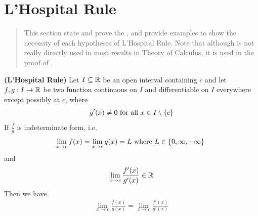 \documentclass{report}
\begin{document}
\section{L'Hospital Rule}
\begin{abstract}
  This section state and prove the , and provide examples to show the necessity of each hypotheses of L'Hospital Rule. Note that although  is not really directly used in most results in Theory of Calculus, it is used in the proof of . 
\end{abstract}
\begin{theorem}
\label{L'Hospital Rule}
\textbf{(L'Hospital Rule)} Let $I \subseteq \mathbb{R}$ be an open interval containing $c$ and let $f,g:I\rightarrow \mathbb{R}$ be two function continuous on $I$ and differentiable on $I$ everywhere except possibly at  $c$, where 
\begin{align*}
g'(x)\neq  0\text{ for all }x\in I \setminus \{ c \}
\end{align*}
If $\frac{f}{g}$ is indeterminate form, i.e. 
\begin{align*}
\lim_{x\to c}f(x)=\lim_{x\to c}g(x)=L\text{ where $L \in \{ 0,\infty,-\infty \}$ }
\end{align*}
and 
\begin{align*}
\lim_{x\to c} \frac{f'(x)}{g'(x)}\in\mathbb{R}
\end{align*}
Then we have 
\begin{align}
\label{result L}
\lim_{x\to c}\frac{f(x)}{g(x)}= \lim_{x\to c}\frac{f'(x)}{g'(x)}
\end{align}
\end{theorem}
\end{document}
